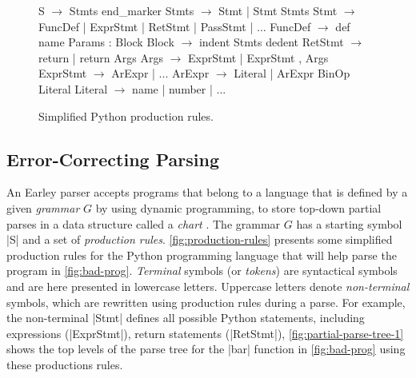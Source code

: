 \begin{figure}[t]
\begin{minipage}[c]{0.47\linewidth}
\begin{rules}
S        $\rightarrow$ Stmts end_marker
Stmts    $\rightarrow$ Stmt \n | Stmt \n Stmts
Stmt     $\rightarrow$ FuncDef | ExprStmt
          | RetStmt | PassStmt | ...
FuncDef  $\rightarrow$ def name Params : Block
Block    $\rightarrow$ \n indent Stmts dedent
RetStmt  $\rightarrow$ return | return Args
Args     $\rightarrow$ ExprStmt | ExprStmt , Args
ExprStmt $\rightarrow$ ArExpr | ...
ArExpr   $\rightarrow$ Literal
          | ArExpr BinOp Literal
Literal  $\rightarrow$ name | number | ...
\end{rules}
\caption{Simplified Python production rules.}
\label{fig:production-rules}
\end{minipage}
\hspace{0.02\linewidth}%
\begin{minipage}[c]{0.50\linewidth}
\hspace*{-0.06\linewidth}%

\end{minipage}
\end{figure}

\subsection{Error-Correcting Parsing}
\label{sec:overview:ec-parsing}

%
An Earley parser accepts programs that belong to a
language that is defined by a given \emph{grammar} $G$
by using dynamic programming, to store top-down partial
parses in a data structure called a \emph{chart} \citep{Earley_1970}.
The grammar $G$ has a starting symbol |S| and a set of \emph{production rules}.
\autoref{fig:production-rules} presents some simplified production rules for the
Python programming language that will help parse the program in
\autoref{fig:bad-prog}. \emph{Terminal} symbols (or \emph{tokens}) are
syntactical symbols and are here presented in lowercase
letters. Uppercase letters denote \emph{non-terminal} symbols, which are
rewritten using production rules during a parse.
For example, the non-terminal |Stmt| defines all
possible Python statements, including expressions (|ExprStmt|), return statements
(|RetStmt|), \etc \autoref{fig:partial-parse-tree-1} shows the top levels of
the parse tree for the |bar| function in \autoref{fig:bad-prog} using these
productions rules.

